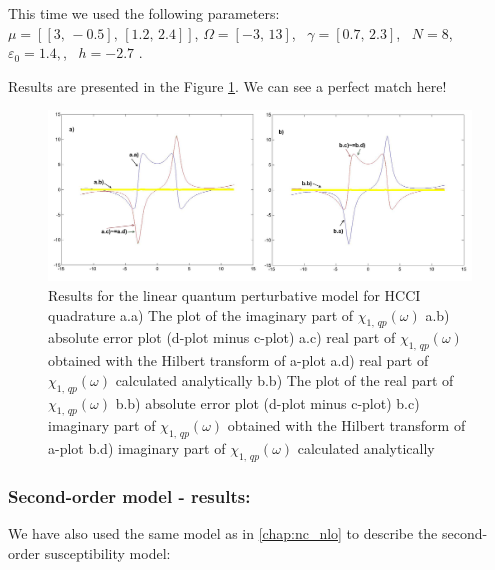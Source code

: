 \documentclass[12pt,twoside,a4paper]{article}
\numberwithin{equation}{subsection}
\numberwithin{figure}{subsection}
\begin{document}
This time we used the following parameters: \\
$\mu = [[3, \, - 0.5], \,[1.2, \,2.4]]$, 
$\Omega = [ - 3, \,13]$, \, 
$\gamma = [0.7, \,2.3]$, \,
$N = 8$, \,
$\varepsilon_{0} = 1.4,$, \, 
$h = - 2.7$ .

Results are presented in the Figure \ref{fig:hcc_qp1}. We can see a perfect match here!

\begin{figure}
  \includegraphics[width=150mm]{img/hcc_qp1.png}
  \caption{Results for the linear quantum perturbative model for HCCI quadrature
    a.a) The plot of the imaginary part of ${\chi_{1, \, qp}}(\omega )$
    a.b) absolute error plot (d-plot minus c-plot) 
    a.c) real part of ${\chi_{1, \, qp}}(\omega )$ obtained with the Hilbert transform of a-plot 
    a.d) real part of ${\chi_{1, \, qp}}(\omega )$ calculated analytically 
    b.b) The plot of the real part of ${\chi_{1, \, qp}}(\omega )$ 
    b.b) absolute error plot (d-plot minus c-plot) 
    b.c) imaginary part of ${\chi_{1, \, qp}}(\omega )$ obtained with the Hilbert transform of a-plot 
    b.d) imaginary part of ${\chi_{1, \, qp}}(\omega )$ calculated analytically  
    \label{fig:hcc_qp1}
  }
\end{figure}

\subsubsection*{Second-order model - results:}

We have also used the same model as in \ref{chap:nc_nlo} to describe the second-order susceptibility model:
\end{document}
